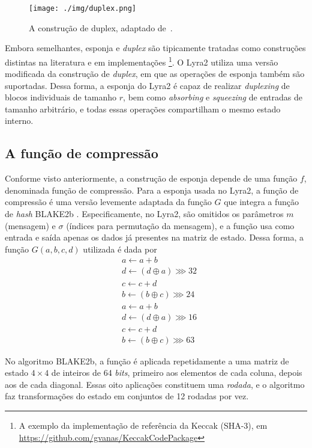 \documentclass{article}
\begin{document}
\begin{figure}[htbp]
\centering
\texttt{[image: ./img/duplex.png]}
\caption{A construção de duplex, adaptado de~\cite{sponge}.\label{img-duplex}}
\end{figure}

Embora semelhantes, esponja e \emph{duplex} são tipicamente tratadas como
construções distintas na literatura \cite{sponge} e em implementações
\footnote{A exemplo da implementação de referência da Keccak (SHA-3), em
\url{https://github.com/gvanas/KeccakCodePackage}}. O Lyra2 utiliza uma versão
modificada da construção de \emph{duplex}, em que as operações de esponja
também são suportadas. Dessa forma, a esponja do Lyra2 é capaz de realizar
\emph{duplexing} de blocos individuais de tamanho $r$, bem como
\emph{absorbing} e \emph{squeezing} de entradas de tamanho arbitrário, e todas
essas operações compartilham o mesmo estado interno.

\subsection{A função de compressão}\label{sec-compression-fn}

Conforme visto anteriormente, a construção de esponja depende de uma função
$f$, denominada função de compressão. Para a esponja usada no Lyra2, a função
de compressão é uma versão levemente adaptada da função $G$ que integra a
função de \emph{hash} BLAKE2b \cite{blake2b}.
%
Especificamente, no Lyra2, são omitidos os parâmetros $m$ (mensagem) e $\sigma$
(índices para permutação da mensagem), e a função usa como entrada e saída
apenas os dados já presentes na matriz de estado. Dessa forma, a função $G(a,
b, c, d)$ utilizada é dada por
\begingroup
\setlength{\jot}{0.1pt}
\begin{align*}
& a \leftarrow a + b \\
& d \leftarrow \left(d \oplus a \right) \ggg 32 \\
& c \leftarrow c + d \\
& b \leftarrow \left(b \oplus c \right) \ggg 24 \\
& a \leftarrow a + b \\
& d \leftarrow \left(d \oplus a \right) \ggg 16 \\
& c \leftarrow c + d \\
& b \leftarrow \left(b \oplus c \right) \ggg 63
\end{align*}
\endgroup

No algoritmo BLAKE2b, a função é aplicada repetidamente a uma matriz de estado
$4 \times 4$ de inteiros de 64 \emph{bits}, primeiro aos elementos de cada
coluna, depois aos de cada diagonal. Essas oito aplicações constituem uma
\emph{rodada}, e o algoritmo faz transformações do estado em conjuntos de 12
rodadas por vez.
\end{document}
